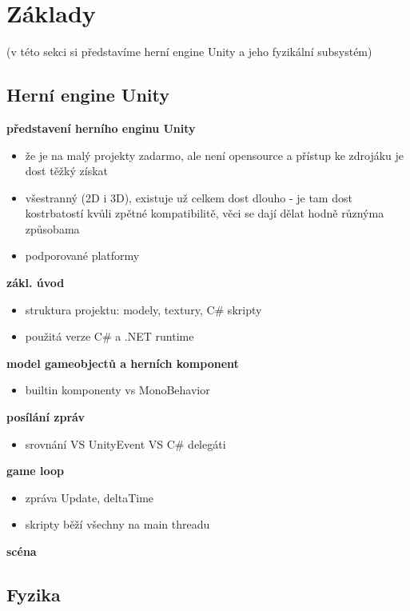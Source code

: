 \chapter{Základy}
(v této sekci si představíme herní engine Unity a jeho fyzikální subsystém)

\section{Herní engine Unity}


\textbf{představení herního enginu Unity}
\begin{itemize}
    \item že je na malý projekty zadarmo, ale není opensource a přístup ke zdrojáku je dost těžký získat
    \item  všestranný (2D i 3D), existuje už celkem dost dlouho - je tam dost kostrbatostí kvůli zpětné kompatibilitě, věci se dají dělat hodně různýma způsobama
    \item  podporované platformy
\end{itemize}

\textbf{zákl. úvod}
\begin{itemize}
    \item struktura projektu: modely, textury, C\# skripty
    \item použitá verze C\# a .NET runtime
\end{itemize}

\textbf{model gameobjectů a herních komponent}
\begin{itemize}
    \item builtin komponenty vs MonoBehavior
\end{itemize}


\textbf{posílání zpráv}
\begin{itemize}
    \item srovnání VS UnityEvent VS C\# delegáti 
\end{itemize}

\textbf{game loop}
\begin{itemize}
    \item zpráva Update, deltaTime
    \item skripty běží všechny na main threadu
\end{itemize}


\textbf{scéna}


\section{Fyzika}

